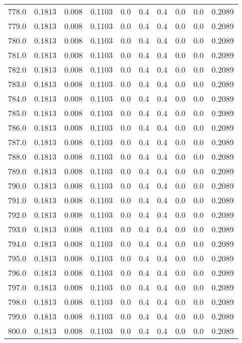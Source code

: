 \begin{longtable}{lrrrrrrrrr}
778.0 & 0.1813 & 0.008 & 0.1103 & 0.0 & 0.4 & 0.4 & 0.0 & 0.0 & 0.2089 \\
779.0 & 0.1813 & 0.008 & 0.1103 & 0.0 & 0.4 & 0.4 & 0.0 & 0.0 & 0.2089 \\
780.0 & 0.1813 & 0.008 & 0.1103 & 0.0 & 0.4 & 0.4 & 0.0 & 0.0 & 0.2089 \\
781.0 & 0.1813 & 0.008 & 0.1103 & 0.0 & 0.4 & 0.4 & 0.0 & 0.0 & 0.2089 \\
782.0 & 0.1813 & 0.008 & 0.1103 & 0.0 & 0.4 & 0.4 & 0.0 & 0.0 & 0.2089 \\
783.0 & 0.1813 & 0.008 & 0.1103 & 0.0 & 0.4 & 0.4 & 0.0 & 0.0 & 0.2089 \\
784.0 & 0.1813 & 0.008 & 0.1103 & 0.0 & 0.4 & 0.4 & 0.0 & 0.0 & 0.2089 \\
785.0 & 0.1813 & 0.008 & 0.1103 & 0.0 & 0.4 & 0.4 & 0.0 & 0.0 & 0.2089 \\
786.0 & 0.1813 & 0.008 & 0.1103 & 0.0 & 0.4 & 0.4 & 0.0 & 0.0 & 0.2089 \\
787.0 & 0.1813 & 0.008 & 0.1103 & 0.0 & 0.4 & 0.4 & 0.0 & 0.0 & 0.2089 \\
788.0 & 0.1813 & 0.008 & 0.1103 & 0.0 & 0.4 & 0.4 & 0.0 & 0.0 & 0.2089 \\
789.0 & 0.1813 & 0.008 & 0.1103 & 0.0 & 0.4 & 0.4 & 0.0 & 0.0 & 0.2089 \\
790.0 & 0.1813 & 0.008 & 0.1103 & 0.0 & 0.4 & 0.4 & 0.0 & 0.0 & 0.2089 \\
791.0 & 0.1813 & 0.008 & 0.1103 & 0.0 & 0.4 & 0.4 & 0.0 & 0.0 & 0.2089 \\
792.0 & 0.1813 & 0.008 & 0.1103 & 0.0 & 0.4 & 0.4 & 0.0 & 0.0 & 0.2089 \\
793.0 & 0.1813 & 0.008 & 0.1103 & 0.0 & 0.4 & 0.4 & 0.0 & 0.0 & 0.2089 \\
794.0 & 0.1813 & 0.008 & 0.1103 & 0.0 & 0.4 & 0.4 & 0.0 & 0.0 & 0.2089 \\
795.0 & 0.1813 & 0.008 & 0.1103 & 0.0 & 0.4 & 0.4 & 0.0 & 0.0 & 0.2089 \\
796.0 & 0.1813 & 0.008 & 0.1103 & 0.0 & 0.4 & 0.4 & 0.0 & 0.0 & 0.2089 \\
797.0 & 0.1813 & 0.008 & 0.1103 & 0.0 & 0.4 & 0.4 & 0.0 & 0.0 & 0.2089 \\
798.0 & 0.1813 & 0.008 & 0.1103 & 0.0 & 0.4 & 0.4 & 0.0 & 0.0 & 0.2089 \\
799.0 & 0.1813 & 0.008 & 0.1103 & 0.0 & 0.4 & 0.4 & 0.0 & 0.0 & 0.2089 \\
800.0 & 0.1813 & 0.008 & 0.1103 & 0.0 & 0.4 & 0.4 & 0.0 & 0.0 & 0.2089 \\

\end{longtable}

